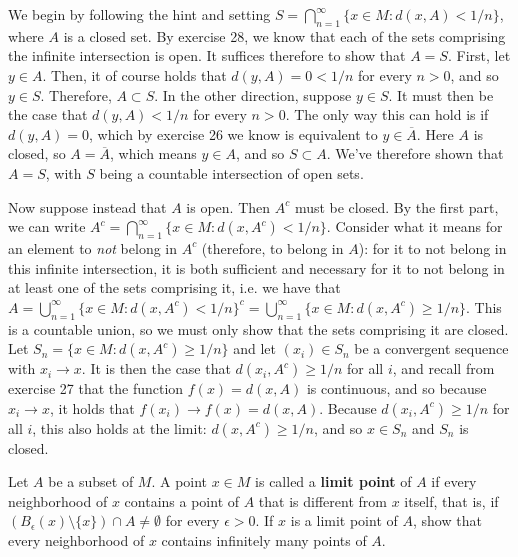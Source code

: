 \begin{solution}
    
    We begin by following the hint and setting $S = \bigcap_{n=1}^{\infty} \{x \in M : d(x, A) < 1/n\}$, where $A$ is a closed set.
    By exercise 28, we know that each of the sets comprising the infinite intersection is open.
    It suffices therefore to show that $A = S$.
    First, let $y \in A$.
    Then, it of course holds that $d(y, A) = 0 < 1/n$ for every $n > 0$, and so $y \in S$.
    Therefore, $A \subset S$.
    In the other direction, suppose $y \in S$.
    It must then be the case that $d(y, A) < 1/n$ for every $n > 0$.
    The only way this can hold is if $d(y, A) = 0$, which by exercise 26 we know is equivalent to $y \in \overline{A}$.
    Here $A$ is closed, so $A = \overline{A}$, which means $y \in A$, and so $S \subset A$.
    We've therefore shown that $A = S$, with $S$ being a countable intersection of open sets.

    Now suppose instead that $A$ is open.
    Then $A^c$ must be closed.
    By the first part, we can write $A^c = \bigcap_{n=1}^{\infty}\{x \in M : d(x, A^c) < 1/n \}$.
    Consider what it means for an element to \textit{not} belong in $A^c$ (therefore, to belong in $A$): for it to not belong in this infinite intersection, it is both sufficient and necessary for it to not belong in at least one of the sets comprising it, i.e. we have that $A = \bigcup_{n=1}^{\infty}\{x \in M : d(x, A^c) < 1/n\}^c = \bigcup_{n=1}^{\infty}\{x \in M : d(x, A^c) \geq 1/n\}$.
    This is a countable union, so we must only show that the sets comprising it are closed.
    Let $S_n = \{x \in M : d(x, A^c) \geq 1/n\}$ and let $(x_i) \in S_n$ be a convergent sequence with $x_i \rightarrow x$.
    It is then the case that $d(x_i, A^c) \geq 1/n$ for all $i$, and recall from exercise 27 that the function $f(x) = d(x, A)$ is continuous, and so because $x_i \rightarrow x$, it holds that $f(x_i) \rightarrow f(x) = d(x, A)$. Because $d(x_i, A^c) \geq 1/n$ for all $i$, this also holds at the limit: $d(x, A^c) \geq 1/n$, and so $x \in S_n$ and $S_n$ is closed.
\end{solution}

\begin{exercise}{33}
    Let $A$ be a subset of $M$.
    A point $x \in M$ is called a \textbf{limit point} of $A$ if every neighborhood of $x$ contains a point of $A$ that is different from $x$ itself, that is, if $(B_{\epsilon}(x) \setminus \{x\}) \cap A \neq \emptyset$ for every $\epsilon > 0$.
    If $x$ is a limit point of $A$, show that every neighborhood of $x$ contains infinitely many points of $A$.
\end{exercise}

